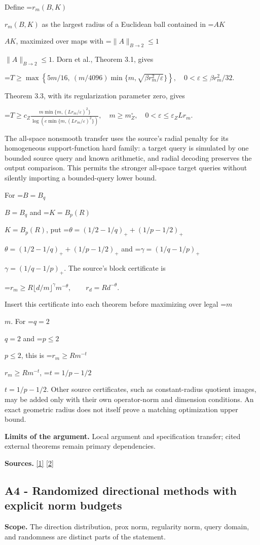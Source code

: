 \documentclass[10pt,a4paper]{article}
\newcommand{\AtlasMath}[1]{\par\begingroup\centering\setbox0=\hbox{$\displaystyle #1$}\ifdim\wd0>1.4\linewidth\typeout{ATLAS WIDE FORMULA: \the\wd0}\fi\ifdim\wd0>\linewidth\resizebox{\linewidth}{!}{\box0}\else\box0\fi\par\endgroup}
\newcommand{\AtlasInlineMath}[1]{\begingroup\setbox0=\hbox{$#1$}\ifdim\wd0>.4\linewidth\endgroup\AtlasMath{#1}\else\endgroup$#1$\fi}
\begin{document}
Define \AtlasInlineMath{r_m(B,K)} as the largest radius of a Euclidean ball contained in \AtlasInlineMath{AK}, maximized over maps with \AtlasInlineMath{\|A\|_{B\to2}\le1}. Dorn et al., Theorem 3.1, gives

\AtlasMath{T\ge\max\left\{5m/16,\ (m/4096)\min\{m,\sqrt{\beta r_m^2/\varepsilon}\}\right\},\quad0<\varepsilon\le\beta r_m^2/32.}

Theorem 3.3, with its regularization parameter zero, gives

\AtlasMath{T\ge c_Z\frac{m\min\{m,(Lr_m/\varepsilon)^2\}}{\log(e\min\{m,(Lr_m/\varepsilon)^2\})},\quad m\ge m_Z^\circ,\quad0<\varepsilon\le\varepsilon_ZLr_m.}

The all-space nonsmooth transfer uses the source's radial penalty for its homogeneous support-function hard family: a target query is simulated by one bounded source query and known arithmetic, and radial decoding preserves the output comparison. This permits the stronger all-space target queries without silently importing a bounded-query lower bound.

For \AtlasInlineMath{B=B_q} and \AtlasInlineMath{K=B_p(R)}, put \AtlasInlineMath{\theta=(1/2-1/q)_++(1/p-1/2)_+} and \AtlasInlineMath{\gamma=(1/q-1/p)_+}. The source's block certificate is

\AtlasMath{r_m\ge R\lfloor d/m\rfloor^\gamma m^{-\theta},\qquad r_d=Rd^{-\theta}.}

Insert this certificate into each theorem before maximizing over legal \AtlasInlineMath{m}. For \AtlasInlineMath{q=2} and \AtlasInlineMath{p\le2}, this is \AtlasInlineMath{r_m\ge Rm^{-t}}, \AtlasInlineMath{t=1/p-1/2}. Other source certificates, such as constant-radius quotient images, may be added only with their own operator-norm and dimension conditions. An exact geometric radius does not itself prove a matching optimization upper bound.

\textbf{Limits of the argument.} Local argument and specification transfer; cited external theorems remain primary dependencies.

\textbf{Sources.} \href{https://arxiv.org/html/2610.00345v1}{[1]} \href{https://arxiv.org/html/2607.16558v2}{[2]}

\subsection{A4 - Randomized directional methods with explicit norm budgets}
\textbf{Scope.} The direction distribution, prox norm, regularity norm, query domain, and randomness are distinct parts of the statement.
\end{document}
